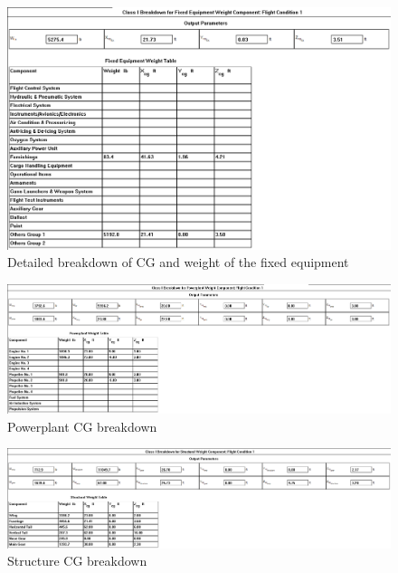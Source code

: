 \documentclass[conf]{new-aiaa}
\begin{document}
\begin{figure}
    \includegraphics[width=\textwidth]{Report3Printouts/Cg/Cg_Empty_Detailed_FixedEquipment_cropped.png}
    \caption{Detailed breakdown of CG and weight of the fixed equipment}
    \label{fig:cg_empty_detailed_fixedequipment}
\end{figure}

\begin{figure}
    \includegraphics[width=\textwidth]{Report3Printouts/Cg/Cg_Empty_Detailed_Powerplant_cropped.png}
    \caption{Powerplant CG breakdown}
    \label{fig:cg_empty_detailed_powerplant}
\end{figure}


\begin{figure}
    \includegraphics[width=\textwidth]{Report3Printouts/Cg/Cg_Empty_Detailed_Structure_cropped.png}
    \caption{Structure CG breakdown}
    \label{fig:cg_empty_detailed_structure}
\end{figure}
\end{document}
